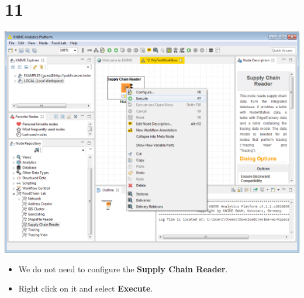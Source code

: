 \documentclass[10pt]{beamer}
\begin{document}
\section{11}
\begin{frame}
	\begin{center}
  		\includegraphics[height=0.6\textheight]{11.png}
	\end{center}
	\begin{itemize}
		\item We do not need to configure the \textbf{Supply Chain Reader}.
		\item Right click on it and select \textbf{Execute}.
	\end{itemize}
\end{frame}
\end{document}
